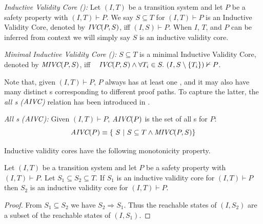 \begin{definition}{\emph{Inductive Validity Core (\ivc):}}
  \label{def:ivc}
  Let $(I, T)$ be a transition system and let $P$ be a
  safety property with $(I, T)\vdash P$.
  We say $S \subseteq T$ for $(I, T)\vdash P$ is an Inductive Validity Core,
  denoted by $\textit{IVC}(P, S)$, iff $(I, S) \vdash P $.
  When $I$, $T$, and $P$ can be inferred from
  context we will simply say $S$ is an inductive validity core.
\end{definition}

\begin{definition}{\emph{Minimal Inductive Validity Core (\mivc):}}
  \label{def:minimal-ivc}
  $S \subseteq T$ is a minimal Inductive Validity Core,
  denoted by $\textit{MIVC}(P, S)$, iff ~
  $\textit{IVC}(P, S) \wedge \forall T_i \in S.~ (I, S\setminus\{ T_i \}) \nvdash P$.
\end{definition}

Note that, given $(I, T) \vdash P$, $P$ always has at least one \mivc, and it may also have many distinct {\mivc}s corresponding to different proof paths. To capture the latter, the \emph{all {\mivc}s ($\textit{AIVC}$)} relation has been introduced in \cite{Murugesan16:renext}.
\begin{definition}{\emph{All {\mivc}s ($\textit{AIVC}$):}}
    \label{def:allivcs}
    Given $(I, T) \vdash P$, $\textit{AIVC}(P)$ is the set of all \mivc s for $P$:
    $$ \textit{AIVC}(P) \equiv  \{\ S~|~S \subseteq T \land  \textit{MIVC}(P, S)\} $$
\end{definition}


Inductive validity cores have the following monotonicity property.

\begin{lemma}
  \label{lem:ivc-monotonic}
  Let $(I, T)$ be a transition system and let $P$ be a safety property
  with $(I, T)\vdash P$. Let $S_1 \subseteq S_2 \subseteq T$. If $S_1$
  is an inductive validity core for $(I, T)\vdash P$ then $S_2$ is an
  inductive validity core for $(I, T)\vdash P$.
\end{lemma}
\begin{proof}
  From $S_1 \subseteq S_2$ we have $S_2 \Rightarrow S_1$. Thus the
  reachable states of $(I, S_2)$ are a subset of the reachable states
  of $(I, S_1)$.
\end{proof}

